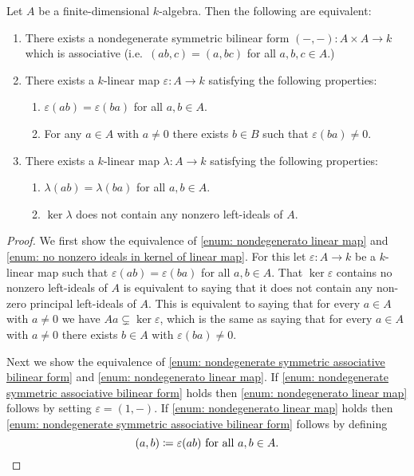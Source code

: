 \begin{prop}
  Let $A$ be a finite-dimensional $k$-algebra.
  Then the following are equivalent:
  \begin{enumerate}[label=\emph{\roman*)},leftmargin=*]
    \item \label{enum: nondegenerate symmetric associative bilinear form}
      There exists a nondegenerate symmetric bilinear form $(-,-) \colon A \times A \to k$ which is associative (i.e.\ $(ab,c) = (a,bc)$ for all $a,b,c \in A$.)
    \item \label{enum: nondegenerato linear map}
      There exists a $k$-linear map $\varepsilon \colon A \to k$ satisfying the following properties:
      \begin{enumerate}[label=\emph{(\roman*)},leftmargin=*]
        \item
          $\varepsilon(ab) = \varepsilon(ba)$ for all $a,b \in A$.
        \item
          For any $a \in A$ with $a \neq 0$ there exists $b \in B$ such that $\varepsilon(ba) \neq 0$.
      \end{enumerate}
    \item \label{enum: no nonzero ideals in kernel of linear map}
      There exists a $k$-linear map $\lambda \colon A \to k$ satisfying the following properties:
      \begin{enumerate}[label=\emph{(\roman*)},leftmargin=*]
        \item
          $\lambda(ab) = \lambda(ba)$ for all $a,b \in A$.
        \item
          $\ker \lambda$ does not contain any nonzero left-ideals of $A$.
      \end{enumerate}
  \end{enumerate}
\end{prop}
\begin{proof}
  We first show the equivalence of \ref{enum: nondegenerato linear map} and \ref{enum: no nonzero ideals in kernel of linear map}.
  For this let $\varepsilon \colon A \to k$ be a $k$-linear map such that $\varepsilon(ab) = \varepsilon(ba)$ for all $a,b \in A$.
  That $\ker \varepsilon$ contains no nonzero left-ideals of $A$ is equivalent to saying that it does not contain any non-zero principal left-ideals of $A$.
  This is equivalent to saying that for every $a \in A$ with $a \neq 0$ we have $Aa \subsetneq \ker \varepsilon$, which is the same as saying that for every $a \in A$ with $a \neq 0$ there exists $b \in A$ with $\varepsilon(ba) \neq 0$.
  
  Next we show the equivalence of \ref{enum: nondegenerate symmetric associative bilinear form} and \ref{enum: nondegenerato linear map}.
  If \ref{enum: nondegenerate symmetric associative bilinear form} holds then \ref{enum: nondegenerato linear map} follows by setting $\varepsilon = (1,-)$.
  If \ref{enum: nondegenerato linear map} holds then \ref{enum: nondegenerate symmetric associative bilinear form} follows by defining
  \[
              (a,b)
    \coloneqq \varepsilon(ab)
    \text{ for all }
    a, b \in A.
    \qedhere
  \]
\end{proof}


